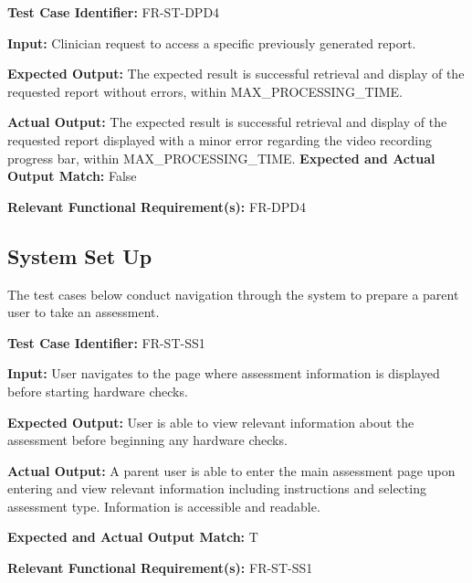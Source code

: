 \documentclass[12pt, titlepage]{article}
\begin{document}
\begin{mdframed}[linewidth=0.5mm] \par
  \textbf{Test Case Identifier:} FR-ST-DPD4 \par
  \textbf{Input:} Clinician request to access a specific previously generated report. \par
  \textbf{Expected Output:} The expected result is successful retrieval and display of the requested report without errors, within MAX\_PROCESSING\_TIME. \par
  \textbf{Actual Output:} The expected result is successful retrieval and display of the requested report displayed with a minor error regarding the video recording progress bar, within MAX\_PROCESSING\_TIME.
  \textbf{Expected and Actual Output Match:} False \par
  \textbf{Relevant Functional Requirement(s):} FR-DPD4
\end{mdframed}

\newpage{}

\subsection{System Set Up}
\hspace{2em}The test cases below conduct navigation through the system to prepare a parent user to take an assessment. 

\begin{mdframed}[linewidth=0.5mm] \par
  \textbf{Test Case Identifier:} FR-ST-SS1 \par
  \textbf{Input:} User navigates to the page where assessment information is displayed
before starting hardware checks. \par
  \textbf{Expected Output:} User is able to view relevant information about the assessment before
  beginning any hardware checks. \par
  \textbf{Actual Output:} A parent user is able to enter the main assessment page upon entering and view relevant information including instructions and selecting assessment type. 
  Information is accessible and readable. \par
  \textbf{Expected and Actual Output Match:} T \par
  \textbf{Relevant Functional Requirement(s):} FR-ST-SS1
\end{mdframed}
\end{document}
